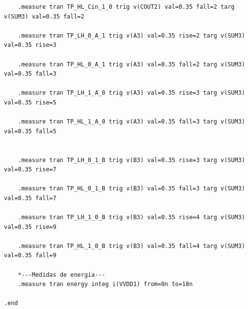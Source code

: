 \documentclass[ecp,tc, english]{iiufrgs}
\begin{document}
\begin{lstlisting}
    .measure tran TP_HL_Cin_1_0 trig v(COUT2) val=0.35 fall=2 targ v(SUM3) val=0.35 fall=2

    .measure tran TP_LH_0_A_1 trig v(A3) val=0.35 rise=2 targ v(SUM3) val=0.35 rise=3

    .measure tran TP_HL_0_A_1 trig v(A3) val=0.35 fall=2 targ v(SUM3) val=0.35 fall=3

    .measure tran TP_LH_1_A_0 trig v(A3) val=0.35 rise=3 targ v(SUM3) val=0.35 rise=5

    .measure tran TP_HL_1_A_0 trig v(A3) val=0.35 fall=3 targ v(SUM3) val=0.35 fall=5


    .measure tran TP_LH_0_1_B trig v(B3) val=0.35 rise=3 targ v(SUM3) val=0.35 rise=7

    .measure tran TP_HL_0_1_B trig v(B3) val=0.35 fall=3 targ v(SUM3) val=0.35 fall=7

    .measure tran TP_LH_1_0_B trig v(B3) val=0.35 rise=4 targ v(SUM3) val=0.35 rise=9

    .measure tran TP_HL_1_0_B trig v(B3) val=0.35 fall=4 targ v(SUM3) val=0.35 fall=9   
    
    *---Medidas de energia---
    .measure tran energy integ i(VVDD1) from=0n to=18n
    
.end
\end{lstlisting}


\end{document}
